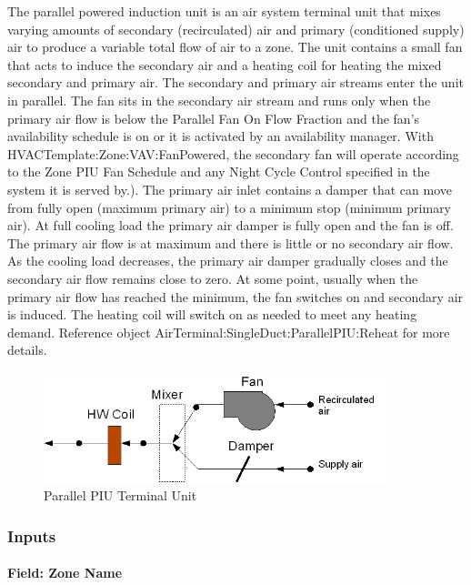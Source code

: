 The parallel powered induction unit is an air system terminal unit that mixes varying amounts of secondary (recirculated) air and primary (conditioned supply) air to produce a variable total flow of air to a zone. The unit contains a small fan that acts to induce the secondary air and a heating coil for heating the mixed secondary and primary air. The secondary and primary air streams enter the unit in parallel. The fan sits in the secondary air stream and runs only when the primary air flow is below the Parallel Fan On Flow Fraction and the fan's availability schedule is on or it is activated by an availability manager. With HVACTemplate:Zone:VAV:FanPowered, the secondary fan will operate according to the Zone PIU Fan Schedule and any Night Cycle Control specified in the system it is served by.). The primary air inlet contains a damper that can move from fully open (maximum primary air) to a minimum stop (minimum primary air). At full cooling load the primary air damper is fully open and the fan is off. The primary air flow is at maximum and there is little or no secondary air flow. As the cooling load decreases, the primary air damper gradually closes and the secondary air flow remains close to zero. At some point, usually when the primary air flow has reached the minimum, the fan switches on and secondary air is induced. The heating coil will switch on as needed to meet any heating demand. Reference object AirTerminal:SingleDuct:ParallelPIU:Reheat for more details.

\begin{figure}[hbtp] %
\centering
\includegraphics[width=0.9\textwidth, height=0.9\textheight, keepaspectratio=true]{media/image609.png}
\caption{Parallel PIU Terminal Unit \protect \label{fig:parallel-piu-terminal-unit-001}}
\end{figure}

\subsubsection{Inputs}\label{inputs-10-008}

\paragraph{Field: Zone Name}\label{field-zone-name-9-000}

